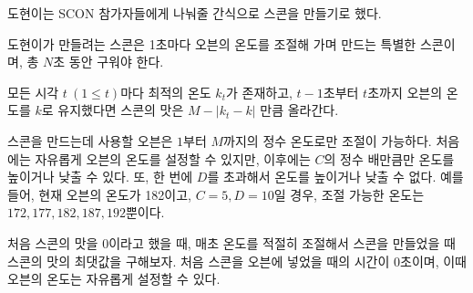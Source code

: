 도현이는 SCON 참가자들에게 나눠줄 간식으로 스콘을 만들기로 했다.  

도현이가 만들려는 스콘은 1초마다 오븐의 온도를 조절해 가며 만드는 특별한 스콘이며, 총 $N$초 동안 구워야 한다.  

모든 시각 $t \ (1 \leq t)$마다 최적의 온도 $k_t$가 존재하고, $t-1$초부터 $t$초까지 오븐의 온도를 $k$로 유지했다면 스콘의 맛은 $M - |k_t - k|$ 만큼 올라간다.  

스콘을 만드는데 사용할 오븐은 $1$부터 $M$까지의 정수 온도로만 조절이 가능하다.  
처음에는 자유롭게 오븐의 온도를 설정할 수 있지만, 이후에는 $C$의 정수 배만큼만 온도를 높이거나 낮출 수 있다. 또, 한 번에 $D$를 초과해서 온도를 높이거나 낮출 수 없다. 예를 들어, 현재 오븐의 온도가 182이고, $C=5, D=10$일 경우, 조절 가능한 온도는 $172, 177, 182, 187, 192$뿐이다.  

처음 스콘의 맛을 $0$이라고 했을 때, 매초 온도를 적절히 조절해서 스콘을 만들었을 때 스콘의 맛의 최댓값을 구해보자. 처음 스콘을 오븐에 넣었을 때의 시간이 $0$초이며, 이때 오븐의 온도는 자유롭게 설정할 수 있다.  